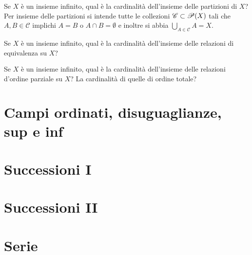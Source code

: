\documentclass[a4paper]{article}\par \usepackage{style}\par
\begin{document}
\begin{es}
  Se $ X $ è un insieme infinito, qual è la cardinalità dell'insieme delle partizioni di $ X $? Per insieme delle partizioni si intende tutte le collezioni $ \mathscr{C} \subset \P(X) $ tali che $ A, B \in \mathscr{C} $ implichi $ A = B $ o $ A \cap B = \emptyset $ e inoltre si abbia $ \bigcup_{A \in \mathscr{C}} A = X $.
\end{es}\par \begin{es}
  Se $ X $ è un insieme infinito, qual è la cardinalità dell'insieme delle relazioni di equivalenza su $ X $?
\end{es}\par \begin{es}
  Se $ X $ è un insieme infinito, qual è la cardinalità dell'insieme delle relazioni d'ordine parziale su $ X $? La cardinalità di quelle di ordine totale?
\end{es}\par \section{Campi ordinati, disuguaglianze, sup e inf}\par 
\section{Successioni I}\par 
\section{Successioni II}\par 
\section{Serie}\par 
\end{document}
